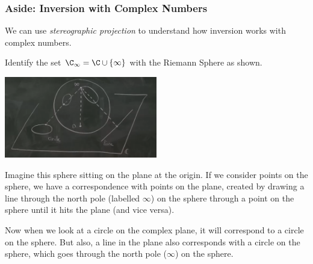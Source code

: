 \documentclass[a4]{scrartcl}
\begin{document}
\subsubsection*{Aside: Inversion with Complex Numbers}

We can use \emph{stereographic projection} to understand how inversion works with complex numbers.

Identify the set $\C_\infty = \C \cup \{\infty\}$ with the Riemann Sphere as shown.
\begin{center}
	\includegraphics[width=0.5\textwidth]{riemann_sphere.png}
\end{center}
Imagine this sphere sitting on the plane at the origin. If we consider points on the sphere, we have a correspondence with points on the plane, created by drawing a line through the north pole (labelled $\infty$) on the sphere through a point on the sphere until it hits the plane (and vice versa). 

Now when we look at a circle on the complex plane, it will correspond to a circle on the sphere. But also, a line in the plane also corresponds with a circle on the sphere, which goes through the north pole ($\infty$) on the sphere.
\end{document}
